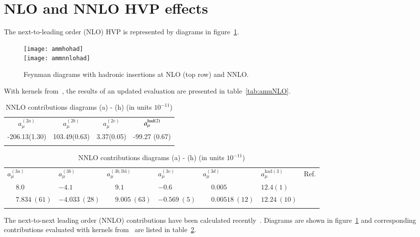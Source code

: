 \documentclass[epj,onecolumn]{webofc}
\newcommand{\bl}{\phantom{-}}
\begin{document}
\section{NLO and NNLO HVP effects}
\label{sec-2}
The next-to-leading order (NLO) HVP is represented by diagrams in
figure~\ref{fig:ammhohad}.
\begin{figure}
\vspace*{-1.0cm}
\centering
\texttt{[image: ammhohad]}\\[3mm]
\texttt{[image: ammnnlohad]}
\caption{Feynman diagrams with hadronic insertions at NLO (top row) and NNLO.}
\label{fig:ammhohad}
\end{figure}
With kernels from~\cite{NLO}, the results of an updated evaluation are
presented in table~\ref{tab:amuNLO}.
\begin{table}[h]
\centering
\caption{NLO contributions diagrams a) - c) (in units $10^{-11}$)}
\label{tab:amuNLO}
{\small
\begin{tabular}{cccc}
\hline\noalign{\smallskip}
 $a_\mu^{(2a)}$ &$a_\mu^{(2b)}$ &$a_\mu^{(2c)}$ &$a_\mu^{{\rm had}(2)}$ \\
\noalign{\smallskip}\hline\noalign{\smallskip}
 -206.13(1.30) & 103.49(0.63)& 3.37(0.05) & -99.27 (0.67) \\ %
\noalign{\smallskip}\hline
\end{tabular}}
\caption{NNLO contributions diagrams (a) - (h) (in units $10^{-11}$)}
\label{tab:amuNNLO}
{\small
\begin{tabular}{llllllc}
\hline\noalign{\smallskip}
 $a_\mu^{(3a)}$ &
 $a_\mu^{(3b)}$ &
 $a_\mu^{(3b,\mathrm{lbl})}$ &
 $a_\mu^{(3c)}$ &
 $a_\mu^{(3d)}$ & $a_\mu^{\mathrm{had}(3)}$ & Ref.\\
 \noalign{\smallskip}\hline\noalign{\smallskip}
 $\bl 8.0$        &
 $-4.1$     	  &
 $\bl 9.1$  	  &
 $-0.6$     	  &
 $\bl 0.005$  &  $12.4(1)$ & ~\cite{NNLO}    \\
 $\bl 7.834~(61)$   &
 $-4.033~(28)$ 	  &
 $ \bl 9.005~(63)$  &
 $-0.569~(5)$	  &
 $\bl 0.00518~(12)$ &  $12.24~(10)$ & ~\cite{Jegerlehner:2015stw}\\
\hline\noalign{\smallskip}
\end{tabular}}
\end{table}
The next-to-next leading order (NNLO) contributions have been
calculated recently~\cite{NNLO}. Diagrams are shown in
figure~\ref{fig:ammhohad} and corresponding contributions evaluated
with kernels from~\cite{NNLO} are listed in table~\ref{tab:amuNNLO}.
\end{document}
